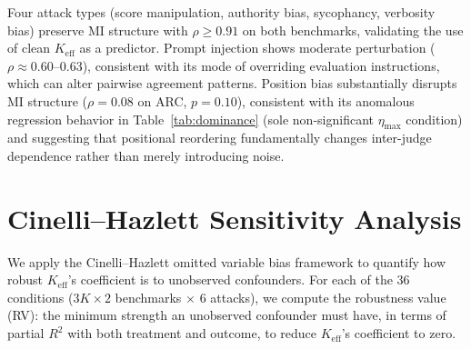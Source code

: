 Four attack types (score manipulation, authority bias, sycophancy, verbosity bias) preserve MI structure with $\rho{\geq}0.91$ on both benchmarks, validating the use of clean $K_{\mathrm{eff}}$ as a predictor. Prompt injection shows moderate perturbation ($\rho{\approx}0.60$--$0.63$), consistent with its mode of overriding evaluation instructions, which can alter pairwise agreement patterns. Position bias substantially disrupts MI structure ($\rho{=}0.08$ on ARC, $p{=}0.10$), consistent with its anomalous regression behavior in Table~\ref{tab:dominance} (sole non-significant $\eta_{\max}$ condition) and suggesting that positional reordering fundamentally changes inter-judge dependence rather than merely introducing noise.

\FloatBarrier
\section{Cinelli--Hazlett Sensitivity Analysis}
\label{app:sensitivity}

We apply the Cinelli--Hazlett omitted variable bias framework to quantify how robust $K_{\mathrm{eff}}$'s coefficient is to unobserved confounders. For each of the 36 conditions ($3K \times 2$ benchmarks $\times$ $6$ attacks), we compute the robustness value (RV): the minimum strength an unobserved confounder must have, in terms of partial $R^2$ with both treatment and outcome, to reduce $K_{\mathrm{eff}}$'s coefficient to zero.

